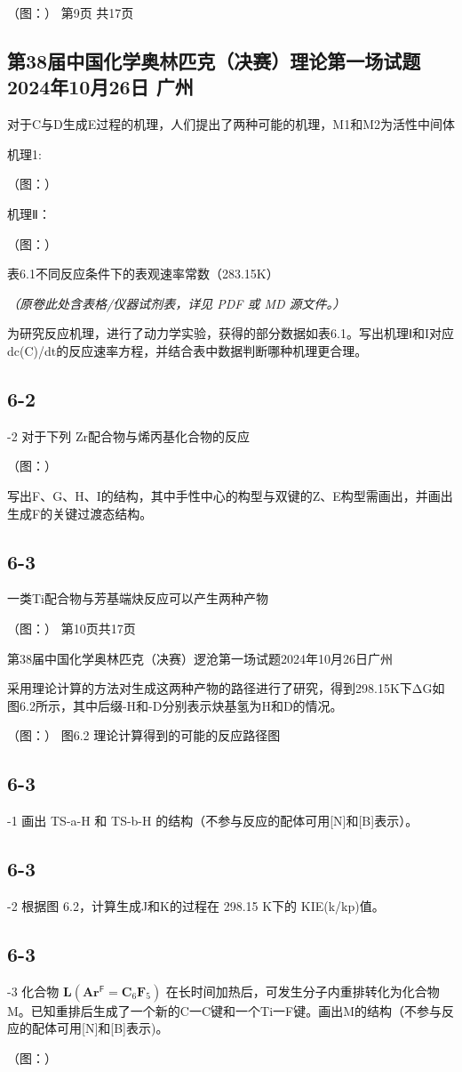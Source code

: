 （图：）
第9页 共17页

\subsection*{第38届中国化学奥林匹克（决赛）理论第一场试题 2024年10月26日 广州}

对于C与D生成E过程的机理，人们提出了两种可能的机理，M1和M2为活性中间体

机理1:

（图：）

机理Ⅱ：

（图：）

表6.1不同反应条件下的表观速率常数（283.15K）

\textit{（原卷此处含表格/仪器试剂表，详见 PDF 或 MD 源文件。）}

为研究反应机理，进行了动力学实验，获得的部分数据如表6.1。写出机理Ⅰ和I对应dc(C)/dt的反应速率方程，并结合表中数据判断哪种机理更合理。

\subsection*{6-2}
-2 对于下列 Zr配合物与烯丙基化合物的反应

（图：）

写出F、G、H、I的结构，其中手性中心的构型与双键的Z、E构型需画出，并画出生成F的关键过渡态结构。

\subsection*{6-3}
一类Ti配合物与芳基端炔反应可以产生两种产物

（图：）
第10页共17页

第38届中国化学奥林匹克（决赛）逻沧第一场试题2024年10月26日广州

采用理论计算的方法对生成这两种产物的路径进行了研究，得到298.15K下ΔG如图6.2所示，其中后缀-H和-D分别表示炔基氢为H和D的情况。

（图：）
图6.2 理论计算得到的可能的反应路径图

\subsection*{6-3}
-1 画出 TS-a-H 和 TS-b-H 的结构（不参与反应的配体可用[N]和[B]表示）。

\subsection*{6-3}
-2 根据图 6.2，计算生成J和K的过程在 298.15 K下的 KIE(k/kp)值。

\subsection*{6-3}
-3 化合物 $\mathbf { L } \left( \mathbf { A } \mathbf { r } ^ { \mathsf { F } } { = } \mathbf { C } _ { 6 } \mathbf { F } _ { 5 } \right)$ 在长时间加热后，可发生分子内重排转化为化合物M。已知重排后生成了一个新的C一C键和一个Ti一F键。画出M的结构（不参与反应的配体可用[N]和[B]表示)。

（图：）
